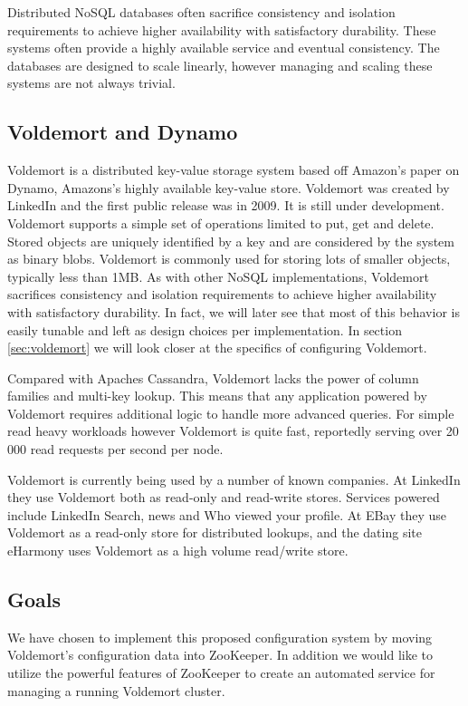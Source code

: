Distributed NoSQL databases often sacrifice consistency and isolation requirements to achieve higher availability with satisfactory durability. These systems often provide a highly available service and eventual consistency.
The databases are designed to scale linearly, however managing and scaling these systems are not always trivial\cite{tellybug}. 


\subsection{Voldemort and Dynamo}
Voldemort is a distributed key-value storage system based off Amazon's paper on Dynamo, Amazons's highly available key-value store. Voldemort was created by LinkedIn and the first public release was in 2009. It is still under development. Voldemort supports a simple set of operations limited to put, get and delete. Stored objects are uniquely identified by a key and are considered by the system as binary blobs. Voldemort is commonly used for storing lots of smaller objects, typically less than 1MB.  As with other NoSQL implementations, Voldemort sacrifices consistency and isolation requirements to achieve higher availability with satisfactory durability. In fact, we will later see that most of this behavior is easily tunable and left as design choices per implementation. In section \ref{sec:voldemort} we will look closer at the specifics of configuring Voldemort. 

Compared with Apaches Cassandra, Voldemort lacks the power of column families and multi-key lookup. This means that any application powered by Voldemort requires additional logic to handle more advanced queries. For simple read heavy workloads however Voldemort is quite fast, reportedly serving over 20 000 read requests per second per node\cite{voldemort}. 

Voldemort is currently being used by a number of known companies. At LinkedIn they use Voldemort both as read-only and read-write stores. Services powered include LinkedIn Search, news and Who viewed your profile. At EBay they use Voldemort as a read-only store for distributed lookups, and the dating site eHarmony uses Voldemort as a high volume read/write store.


\subsection{Goals}
We have chosen to implement this proposed configuration system by moving Voldemort's configuration data into ZooKeeper. In addition we would like to utilize the powerful features of ZooKeeper to create an automated service for managing a running Voldemort cluster. 

